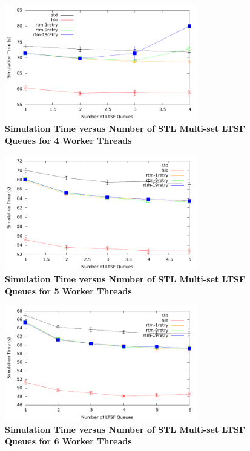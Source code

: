 \documentclass[11pt]{book}
\begin{document}
\begin{figure}
    \centering
    \graphicspath{ {./figures/} }
    \includegraphics[width=0.75\textwidth,keepaspectratio]{hugeepidemicsim-CONTmig-timeVSschedQs-multiset-4thread}
    \caption{\textbf{Simulation Time versus Number of STL Multi-set LTSF Queues for 4
        Worker Threads}}\label{fig:contThrMig_timeVSschq_4threads}
\end{figure}

\begin{figure}
    \centering
    \graphicspath{ {./figures/} }
    \includegraphics[width=0.75\textwidth,keepaspectratio]{hugeepidemicsim-CONTmig-timeVSschedQs-multiset-5thread}
    \caption{\textbf{Simulation Time versus Number of STL Multi-set LTSF Queues for 5
        Worker Threads}}\label{fig:contThrMig_timeVSschq_5threads}
\end{figure}

\begin{figure}
    \centering
    \graphicspath{ {./figures/} }
    \includegraphics[width=0.75\textwidth,keepaspectratio]{hugeepidemicsim-CONTmig-timeVSschedQs-multiset-6thread}
    \caption{\textbf{Simulation Time versus Number of STL Multi-set LTSF Queues for 6
        Worker Threads}}\label{fig:contThrMig_timeVSschq_6threads}
\end{figure}
\end{document}
